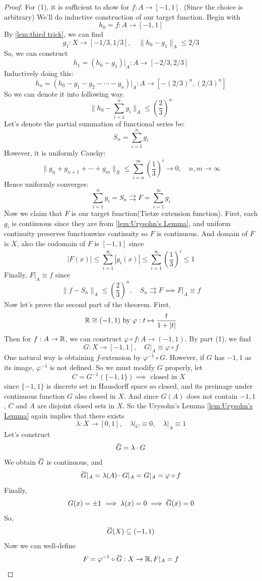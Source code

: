 \documentclass[12pt, a4paper, twoside]{article}
\newcommand{\overbar}[1]{\mkern 1.5mu\overline{\mkern-1.5mu#1\mkern-1.5mu}\mkern 1.5mu}
\newcommand{\norm}[1]{\|{#1}\|}
\theoremstyle{plain}
\begin{document}
\begin{proof}
    For (1), it is sufficient to show for $f: A \rightarrow [-1, 1]$. (Since the choice is arbitrary) 
    We'll do inductive construction of our target function. Begin with 
    \[h_0 = f: A \rightarrow [-1, 1]\]
    By \ref{lem:third trick}, we can find 
    \[g_1: X \rightarrow [-1/3, 1/3], \quad \norm{h_0 - g_1}_A \leq 2/3\]
    So, we can construct 
    \[h_1 = (h_0 - g_1)|_A : A \rightarrow [-2/3, 2/3]\]
    Inductively doing this: 
    \[h_n = (h_0 - g_1 - g_2 - \cdots - g_n)|_A : A \rightarrow [-(2/3)^n, (2/3)^n]\]
    So we can denote it into following way. 
    \[\norm{h_0 - \sum_{i = 1}^n g_i}_A \leq \left(\frac{2}{3}\right)^n\]
    Let's denote the partial summation of functional series be: 
    \[S_n = \sum_{i = 1}^{n} g_i\]
    However, it is uniformly Cauchy: 
    \[\norm{g_n + g_{n+1} + \cdots + g_m}_X \leq \sum_{i = n}^{m} \left(\frac{1}{3}\right)^i \rightarrow 0 , \quad n, m \rightarrow \infty\]
    Hence uniformly converges: 
    \[\sum_{i = 1}^{n} g_i = S_n \rightrightarrows F = \sum_{i=1}^{\infty} g_i\]
    Now we claim that $F$ is our target function(Tietze extension function). 
    First, each $g_i$ is continuous since they are from \ref{lem:Urysohn's Lemma}, 
    and uniform continuity preserves functionwise continuity so $F$ is continuous. 
    And domain of $F$ is $X$, also the codomain of $F$ is $[-1, 1]$ since 
    \[|F(x)| \leq \sum_{i=1}^{\infty} |g_i(x)| \leq \sum_{i=1}^{\infty} \left(\frac{1}{3}\right)^i \leq 1\]
    Finally, $F|_A \equiv f$ since 
    \[\norm{f - S_n}_A \leq \left(\frac{2}{3}\right)^n , \quad S_n \rightrightarrows F \implies F|_A \equiv f\]
    Now let's prove the second part of the theorem. First, 
    \[{\mathbb {R}} \cong (-1, 1) \text{ by } \varphi: t \mapsto \frac{t}{1 + |t|}\]
    Then for $f: A \rightarrow {\mathbb {R}}$, we can construct $\varphi \circ f : A \rightarrow (-1, 1)$. 
    By part (1), we find 
    \[G: X \rightarrow [-1, 1], \quad G|_A \equiv \varphi \circ f\]
    One natural way is obtaining $f$-extension by $\varphi^{-1} \circ G$. However, 
    if $G$ has $-1, 1$ as its image, $\varphi^{-1}$ is not defined. 
    So we must modify $G$ properly, let 
    \[C = G^{-1}(\{-1, 1\}) \implies \text{ closed in $X$ }\]
    since $\{-1, 1\}$ is discrete set in Hausdorff space so closed, and its preimage under continuous function $G$ also closed in $X$. 
    And since $G(A)$ does not contain $-1, 1$ , $C$ and $A$ are disjoint closed sets in $X$. 
    So the Urysohn's Lemma \ref{lem:Urysohn's Lemma} again implies that there exists 
    \[\lambda: X \rightarrow [0, 1], \quad \lambda|_C \equiv 0, \quad \lambda|_A \equiv 1\]
    Let's construct 
    \[\overbar{G} = \lambda \cdot G\]
    We obtain $\overbar{G}$ is continuous, and 
    \[\overbar{G}|_A = \lambda(A) \cdot G|_A = G|_A = \varphi \circ f\]
    Finally, 
    \[G(x) = \pm 1 \implies \lambda(x) = 0 \implies \overbar{G}(x) = 0\]
    So, 
    \[\overbar{G}(X) \subseteq (-1, 1)\]
    Now we can well-define 
    \[F = \varphi^{-1} \circ \overbar{G} : X \rightarrow \BR , F|_A = f \]
\end{proof}
\end{document}
